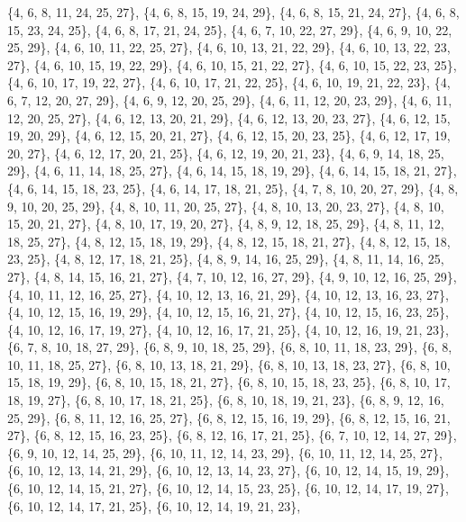\documentclass[11pt,a4paper]{article}
\begin{document}
{\{4, 6, 8, 11, 24, 25, 27\}, \{4, 6, 8, 15, 19, 24, 29\}, \{4, 6, 8, 15, 21, 24, 27\}, \{4, 6, 8, 15, 23, 24, 25\}, \{4, 6, 8, 17, 21, 24, 25\},
\{4, 6, 7, 10, 22, 27, 29\}, \{4, 6, 9, 10, 22, 25, 29\}, \{4, 6, 10, 11, 22, 25, 27\}, \{4, 6, 10, 13, 21, 22, 29\}, \{4, 6, 10, 13, 22, 23, 27\},
\{4, 6, 10, 15, 19, 22, 29\}, \{4, 6, 10, 15, 21, 22, 27\}, \{4, 6, 10, 15, 22, 23, 25\}, \{4, 6, 10, 17, 19, 22, 27\}, \{4, 6, 10, 17, 21, 22, 25\},
\{4, 6, 10, 19, 21, 22, 23\}, \{4, 6, 7, 12, 20, 27, 29\}, \{4, 6, 9, 12, 20, 25, 29\}, \{4, 6, 11, 12, 20, 23, 29\}, \{4, 6, 11, 12, 20, 25, 27\},
\{4, 6, 12, 13, 20, 21, 29\}, \{4, 6, 12, 13, 20, 23, 27\}, \{4, 6, 12, 15, 19, 20, 29\}, \{4, 6, 12, 15, 20, 21, 27\}, \{4, 6, 12, 15, 20, 23, 25\},
\{4, 6, 12, 17, 19, 20, 27\}, \{4, 6, 12, 17, 20, 21, 25\}, \{4, 6, 12, 19, 20, 21, 23\}, \{4, 6, 9, 14, 18, 25, 29\}, \{4, 6, 11, 14, 18, 25, 27\},
\{4, 6, 14, 15, 18, 19, 29\}, \{4, 6, 14, 15, 18, 21, 27\}, \{4, 6, 14, 15, 18, 23, 25\}, \{4, 6, 14, 17, 18, 21, 25\}, \{4, 7, 8, 10, 20, 27, 29\},
\{4, 8, 9, 10, 20, 25, 29\}, \{4, 8, 10, 11, 20, 25, 27\}, \{4, 8, 10, 13, 20, 23, 27\}, \{4, 8, 10, 15, 20, 21, 27\}, \{4, 8, 10, 17, 19, 20, 27\},
\{4, 8, 9, 12, 18, 25, 29\}, \{4, 8, 11, 12, 18, 25, 27\}, \{4, 8, 12, 15, 18, 19, 29\}, \{4, 8, 12, 15, 18, 21, 27\}, \{4, 8, 12, 15, 18, 23, 25\},
\{4, 8, 12, 17, 18, 21, 25\}, \{4, 8, 9, 14, 16, 25, 29\}, \{4, 8, 11, 14, 16, 25, 27\}, \{4, 8, 14, 15, 16, 21, 27\}, \{4, 7, 10, 12, 16, 27, 29\},
\{4, 9, 10, 12, 16, 25, 29\}, \{4, 10, 11, 12, 16, 25, 27\}, \{4, 10, 12, 13, 16, 21, 29\}, \{4, 10, 12, 13, 16, 23, 27\}, \{4, 10, 12, 15, 16, 19, 29\},
\{4, 10, 12, 15, 16, 21, 27\}, \{4, 10, 12, 15, 16, 23, 25\}, \{4, 10, 12, 16, 17, 19, 27\}, \{4, 10, 12, 16, 17, 21, 25\}, \{4, 10, 12, 16, 19, 21, 23\},
\{6, 7, 8, 10, 18, 27, 29\}, \{6, 8, 9, 10, 18, 25, 29\}, \{6, 8, 10, 11, 18, 23, 29\}, \{6, 8, 10, 11, 18, 25, 27\}, \{6, 8, 10, 13, 18, 21, 29\},
\{6, 8, 10, 13, 18, 23, 27\}, \{6, 8, 10, 15, 18, 19, 29\}, \{6, 8, 10, 15, 18, 21, 27\}, \{6, 8, 10, 15, 18, 23, 25\}, \{6, 8, 10, 17, 18, 19, 27\},
\{6, 8, 10, 17, 18, 21, 25\}, \{6, 8, 10, 18, 19, 21, 23\}, \{6, 8, 9, 12, 16, 25, 29\}, \{6, 8, 11, 12, 16, 25, 27\}, \{6, 8, 12, 15, 16, 19, 29\},
\{6, 8, 12, 15, 16, 21, 27\}, \{6, 8, 12, 15, 16, 23, 25\}, \{6, 8, 12, 16, 17, 21, 25\}, \{6, 7, 10, 12, 14, 27, 29\}, \{6, 9, 10, 12, 14, 25, 29\},
\{6, 10, 11, 12, 14, 23, 29\}, \{6, 10, 11, 12, 14, 25, 27\}, \{6, 10, 12, 13, 14, 21, 29\}, \{6, 10, 12, 13, 14, 23, 27\}, \{6, 10, 12, 14, 15, 19, 29\},
\{6, 10, 12, 14, 15, 21, 27\}, \{6, 10, 12, 14, 15, 23, 25\}, \{6, 10, 12, 14, 17, 19, 27\}, \{6, 10, 12, 14, 17, 21, 25\}, \{6, 10, 12, 14, 19, 21, 23\},
}
\end{document}

